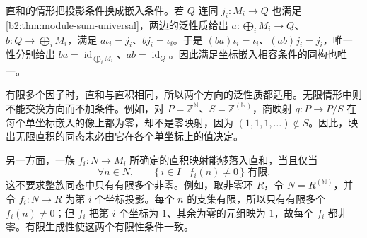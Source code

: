 \ProseParagraphBreak
直和的情形把投影条件换成嵌入条件。若 \(Q\) 连同 \(j_i:M_i\to Q\) 也满足\cref{b2:thm:module-sum-universal}，两边的泛性质给出 \(a:\bigoplus_iM_i\to Q\)、\(b:Q\to\bigoplus_iM_i\)，满足 \(a\iota_i=j_i\)、\(bj_i=\iota_i\)。于是 \((ba)\iota_i=\iota_i\)、\((ab)j_i=j_i\)，唯一性分别给出 \(ba=\operatorname{id}_{\bigoplus_iM_i}\)、\(ab=\operatorname{id}_Q\)。因此满足坐标嵌入相容条件的同构也唯一。

\ProseParagraphBreak
有限多个因子时，直和与直积相同，所以两个方向的泛性质都适用。无限情形中则不能交换方向而不加条件。例如，对 \(P=\mathbb Z^{\mathbb N}\)、\(S=\mathbb Z^{(\mathbb N)}\)，商映射 \(q:P\to P/S\) 在每个单坐标嵌入的像上都为零，却不是零映射，因为 \((1,1,1,\ldots)\notin S\)。因此，映出无限直积的同态未必由它在各个单坐标上的值决定。

\ProseParagraphBreak
另一方面，一族 \(f_i:N\to M_i\) 所确定的直积映射能够落入直和，当且仅当
\[
	\forall n\in N,\qquad\{\,i\in I\mid f_i(n)\ne0\,\}\;\text{有限}.
\]
这不要求整族同态中只有有限多个非零。例如，取非零环 \(R\)，令 \(N=R^{(\mathbb N)}\)，并令 \(f_i:N\to R\) 为第 \(i\) 个坐标投影。每个 \(n\) 的支集有限，所以只有有限多个 \(f_i(n)\ne0\)；但 \(f_i\) 把第 \(i\) 个坐标为 \(1\)、其余为零的元组映为 \(1\)，故每个 \(f_i\) 都非零。有限生成性使这两个有限性条件一致。

